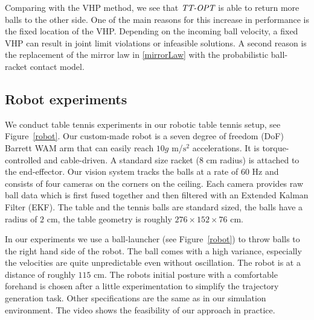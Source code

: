 Comparing with the VHP method, we see that $\emph{TT-OPT}$ is able to return more balls to the other side. One of the main reasons for this increase in performance is the fixed location of the VHP. Depending on the incoming ball velocity, a fixed VHP can result in joint limit violations or infeasible solutions. A second reason is the replacement of the mirror law in \eqref{mirrorLaw} with the probabilistic ball-racket contact model. 

\subsection{Robot experiments}

We conduct table tennis experiments in our robotic table tennis setup, see Figure~\ref{robot}. Our custom-made robot is a seven degree of freedom (DoF) Barrett WAM arm that can easily reach $10g$ m/$\textrm{s}^2$ accelerations. It is torque-controlled and cable-driven. A standard size racket ($8$ cm radius) is attached to the end-effector. Our vision system tracks the balls at a rate of $60$ Hz and consists of four cameras on the corners on the ceiling. Each camera provides raw ball data which is first fused together and then filtered with an Extended Kalman Filter (EKF). The table and the tennis balls are standard sized, the balls have a radius of $2$ cm, the table geometry is roughly $276 \times 152 \times 76$ cm.

In our experiments we use a ball-launcher (see Figure~\ref{robot}) to throw balls to the right hand side of the robot. The ball comes with a high variance, especially the velocities are quite unpredictable even without oscillation. The robot is at a distance of roughly $115$ cm. The robots initial posture with a comfortable forehand is chosen after a little experimentation to simplify the trajectory generation task. Other specifications are the same as in our simulation environment. The video shows the feasibility of our approach in practice.

